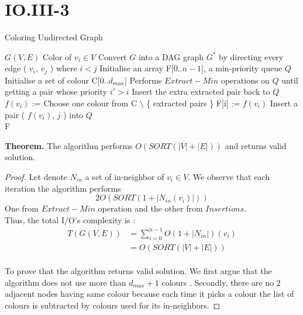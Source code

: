 \section*{IO.III-3}

\begin{algorithm}
  \caption{Coloring Undirected Graph}
  \label{alg:global_minimum}
  \begin{algorithmic}
    \renewcommand{\algorithmicrequire}{\textbf{Input:}}
    \renewcommand{\algorithmicensure}{\textbf{Output:}}
    \algnewcommand{}
    \algnewcommand\Operation{\item[\algorithmicoperation]}
    \Require $G( V, E )$
    \Ensure Color of $v_i \in V$
    \Operation
    \State Convert $G$ into a DAG graph $G^*$ by directing every edge ( $v_i$, $v_j$ ) where $i < j$
    \State Initialise an array F[0..$n-1$], a min-priority queue $Q$
    \State Initialise a set of colour C[0..$d_{max}$]
    	\State Performs $Extract-Min$ operations on $Q$ until getting a pair whose priority $i' > i$
	\State Insert the extra extracted pair back to $Q$
	\State $f(v_i)$ := Choose one colour from C $\setminus$ \{ extracted pairs \}
	\State F[i] := $f(v_i)$
	        \State Insert a pair ( $f(v_i)$, $j$ ) into $Q$
	   \EndFor
    \EndFor \\
    \Return F
  \end{algorithmic}
\end{algorithm}
\textbf{Theorem.} The algorithm performs $O( SORT(|V|+|E|) )$ and returns valid solution.

\begin{proof}
    Let denote $N_{in}$ a set of in-neighbor of $v_i \in V$. We observe that each iteration the algorithm performs
    $$2O( SORT(1 + |N_{in}(v_i)| ))$$
One from $Extract-Min$ operation and the other from $Insertions$. \\
Thus, the total I/O's complexity  is :
\begin{align*}
    T(G(V,E)) &= \sum^{n-1}_{i=0}{O( 1 + |N_{in}|)(v_i)} \\
    &= O( SORT( |V|+|E| ))
\end{align*}
\\
To prove that the algorithm returns valid solution. We first argue that the algorithm does not use more than $d_{max} + 1 $ colours .
Secondly, there are no 2 adjacent nodes having same colour because each time it picks a colour the list of colours is subtracted by colours used for its in-neighbors.

\end{proof}
